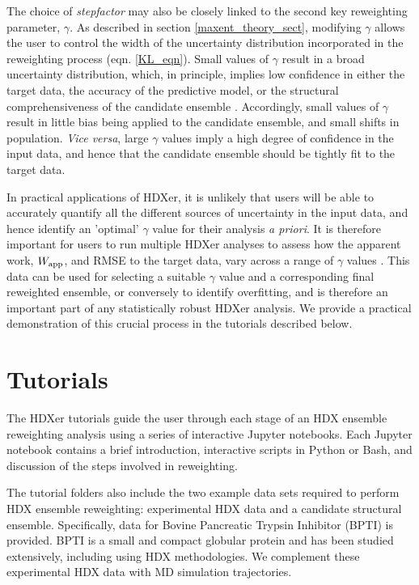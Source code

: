 \documentclass[9pt,tutorial]{livecoms}
\begin{document}
The choice of \textit{stepfactor} may also be closely linked to the second key reweighting parameter, $\gamma$.
As described in section \ref{maxent_theory_sect}, modifying $\gamma$ allows the user to control the width of the uncertainty distribution incorporated in the reweighting process (eqn. \ref{KL_eqn}).
Small values of $\gamma$ result in a broad uncertainty distribution, which, in principle, implies low confidence in either the target data, the accuracy of the predictive model, or the structural comprehensiveness of the candidate ensemble \cite{Orioli2020, Hummer2015}.
Accordingly, small values of $\gamma$ result in little bias being applied to the candidate ensemble, and small shifts in population.
\textit{Vice versa}, large $\gamma$ values imply a high degree of confidence in the input data, and hence that the candidate ensemble should be tightly fit to the target data.

In practical applications of HDXer, it is unlikely that users will be able to accurately quantify all the different sources of uncertainty in the input data, and hence identify an 'optimal' $\gamma$ value for their analysis \textit{a priori}.
It is therefore important for users to run multiple HDXer analyses to assess how the apparent work, $W_\textnormal{app}$, and RMSE to the target data, vary across a range of $\gamma$ values \cite{Orioli2020}.
This data can be used for selecting a suitable $\gamma$ value and a corresponding final reweighted ensemble, or conversely to identify overfitting, and is therefore an important part of any statistically robust HDXer analysis.
We provide a practical demonstration of this crucial process in the tutorials described below.

\section{Tutorials}\label{tutorial_sect}

The HDXer tutorials guide the user through each stage of an HDX ensemble reweighting analysis using a series of interactive Jupyter notebooks.
Each Jupyter notebook contains a brief introduction, interactive scripts in Python or Bash, and discussion of the steps involved in reweighting.

The tutorial folders also include the two example data sets required to perform HDX ensemble reweighting: experimental HDX data and a candidate structural ensemble.
Specifically, data for Bovine Pancreatic Trypsin Inhibitor (BPTI) is provided.
BPTI is a small and compact globular protein and has been studied extensively, including using HDX methodologies. 
We complement these experimental HDX data with MD simulation trajectories.
\end{document}
